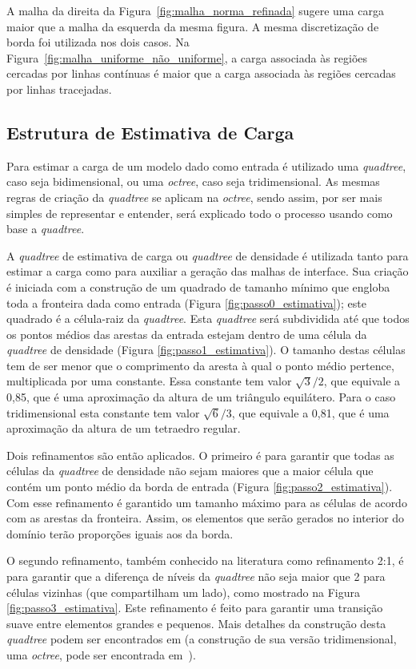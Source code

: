 A malha da direita da Figura~\ref{fig:malha_norma_refinada} sugere uma carga maior que a malha da esquerda da mesma figura. A mesma discretização de borda foi utilizada nos dois casos. Na Figura~\ref{fig:malha_uniforme_não_uniforme}, a carga associada às regiões cercadas por linhas contínuas é maior que a carga associada às regiões cercadas por linhas tracejadas.

\subsection{Estrutura de Estimativa de Carga}

Para estimar a carga de um modelo dado como entrada é utilizado uma \textit{quadtree}, caso seja bidimensional, ou uma \textit{octree}, caso seja tridimensional. As mesmas regras de criação da \textit{quadtree} se aplicam na \textit{octree}, sendo assim, por ser mais simples de representar e entender, será explicado todo o processo usando como base a \textit{quadtree}.

A \textit{quadtree} de estimativa de carga ou \textit{quadtree} de densidade é utilizada tanto para estimar a carga como para auxiliar a geração das malhas de interface. Sua criação é iniciada com a construção de um quadrado de tamanho mínimo que engloba toda a fronteira dada como entrada (Figura \ref{fig:passo0_estimativa}); este quadrado é a célula-raiz da \textit{quadtree}. Esta \textit{quadtree} será subdividida até que todos os pontos médios das arestas da entrada estejam dentro de uma célula da \textit{quadtree} de densidade (Figura \ref{fig:passo1_estimativa}). O tamanho destas células tem de ser menor que o comprimento da aresta à qual o ponto médio pertence, multiplicada por uma constante. Essa constante tem valor $\sqrt{3}/2$, que equivale a 0,85, que é uma aproximação da altura de um triângulo equilátero. Para o caso tridimensional esta constante tem valor $\sqrt{6}/3$, que equivale a 0,81, que é uma aproximação da altura de um tetraedro regular.

Dois refinamentos são então aplicados. O primeiro é para garantir que todas as células da \textit{quadtree} de densidade não sejam maiores que a maior célula que contém um ponto médio da borda de entrada (Figura \ref{fig:passo2_estimativa}). Com esse refinamento é garantido um tamanho máximo para as células de acordo com as arestas da fronteira. Assim, os elementos que serão gerados no interior do domínio terão proporções iguais aos da borda. 

O segundo refinamento, também conhecido na literatura como refinamento 2:1, é para garantir que a diferença de níveis da \textit{quadtree} não seja maior que 2 para células vizinhas (que compartilham um lado), como mostrado na Figura \ref{fig:passo3_estimativa}. Este refinamento é feito para garantir uma transição suave entre elementos grandes e pequenos. Mais detalhes da construção desta \textit{quadtree} podem ser encontrados em \cite{bib:Miranda99} (a construção de sua versão tridimensional, uma \textit{octree}, pode ser encontrada em~\cite{bib:Cavalcante-Neto01}).


